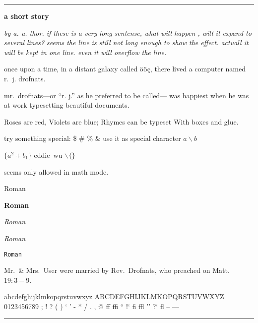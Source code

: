 \hrule
\vskip 1in
\centerline{\bf a short story}
\vskip 6pt
\centerline{\sl by a. u. thor. if these is a 
very long sentense, what will happen , will it expand to several lines?
seems the line is still not long enough to show the effect. actuall it will be kept
in one line. even it will overflow the line.}
\vskip 0.5cm
once upon a time, in a distant
  gal\-axy called \"o\"o\c c,
there lived a computer
named r.~j. drofnats.

mr.~drofnats---or ``r. j.'' as
he preferred to be called---%
was happiest when he was at work
typesetting beautiful documents.

{\obeylines\smallskip
Roses are red,
\quad Violets are blue;
Rhymes can be typeset
\quad With boxes and glue.
\smallskip}

try something special:
\$ \# \% \&
use it as special character
$a\backslash b$ 

$\{a^2+b_1\}$ eddie~wu
$\backslash \{ \}$

seems only allowed in math mode.

{\rm Roman}

{\bf Roman}

{\it Roman}

{\sl Roman}

{\tt Roman}



Mr.~\& Mrs.~User were married by
Rev.~Drofnats, who preached on Matt.~$19:3-9$.

abcdefghijklmkopqrstuvwxyz
ABCDEFGHIJKLMKOPQRSTUVWXYZ
0123456789
; ! ? ( ) ` ' - * / . , @
ff ffi `` !`
fi ffl '' ?`
fl -- --- 

\vskip 1in
\hrule
\vfill\eject

